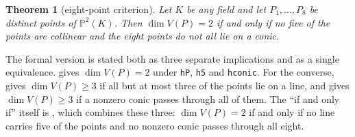 \documentclass[11pt]{article}
\newtheorem{theorem}{Theorem}
\theoremstyle{definition}
\theoremstyle{remark}
\newcommand{\lean}[1]{\texttt{#1}}
\newcommand{\PP}{\mathbb{P}}
\begin{document}
\begin{theorem}[eight-point criterion]\label{thm:criterion}
Let $K$ be any field and let $P_1,\dots,P_8$ be distinct points of $\PP^2(K)$. Then
$\dim V(P)=2$ if and only if no five of the points are collinear and the eight points do not all
lie on a conic.
\end{theorem}

The formal version is stated both as three separate implications and as a single equivalence.
 gives
$\dim V(P)=2$ under \lean{hP}, \lean{h5} and \lean{hconic}. For the converse,
 gives $\dim V(P)\ge3$ if all but at most three of the points lie on
a line, and  gives $\dim V(P)\ge 3$ if a nonzero conic passes
through all of them. The ``if and only if'' itself is
, which combines these three: $\dim V(P)=2$ if and only if
no line carries five of the points and no nonzero conic passes through all eight.
\end{document}
